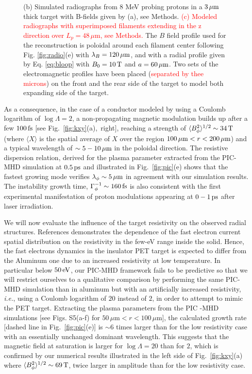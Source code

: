 \documentclass[aps,twocolumn,showpacs,superscriptaddress]{revtex4}
\begin{document}
\begin{figure}
{(b) Simulated radiographs from 8 MeV probing protons in a 
$3\,\rm \mu m$ thick target with B-fields given by (a), see Methods.
\textcolor{red}{(c) Modeled radiographs with superimposed filaments extending in the z direction over $L_p = 48\, \mu$m, see Methods.} The $B$ field profile used for the reconstruction is poloidal around each filament center following Fig. \ref{fig:radio}(e) with $\lambda_B = 120\,\rm \mu m$, and with a radial profile given by Eq. \eqref{eq:bloop} with $B_0=10\,\rm T$ and $a = 60\,\rm \mu m$.
Two sets of the electromagnetic profiles have been placed (\textcolor{red}{separated by thee microns}) on the front and the rear side of the target to model both expanding side of the target.
}
\end{figure}
%
As a consequence, in the case of a conductor modeled by using a Coulomb logarithm of $\log \Lambda = 2$,  a non-propagating magnetic modulation builds up after a few $100\,\rm fs$ [see \mbox{Fig.~\ref{fig:kxy}(a), right}], reaching a strength of  $\langle B_\phi^2\rangle^{1/2}\sim 34\,\rm T$ (where $\langle X \rangle$ is the spatial average of $X$ over the region  $100\,\mu\mathrm{m}<r<200\,\mu \rm m$) and a typical wavelength of $\sim 5-10\,\rm \mu m$  in the poloidal direction. The resistive dispersion relation, derived for the plasma parameter extracted from the PIC-MHD simulation at $0.5\,\rm ps$ and illustrated in Fig.~\ref{fig:pic}(e)  shows that the fastest growing mode verifies $\lambda_\phi \sim 5\,\mu \rm m$  in agreement with our simulation results. The instability  growth time, $\Gamma_\phi^{-1} \sim 160\,\rm fs$  is also  consistent with the first experimental manifestation of proton modulations appearing at $0-1\,\rm ps$ after laser irradiation.

We will now evaluate the influence of the target resistivity on the observed radial structures.
References \cite{PRL_McKenna_2011, PRL_MacLellan_2013} demonstrates the dependence of the fast electron current spatial distribution  on the resistivity in the few-eV range inside the solid. Hence, the fast electrons dynamics in the insulator PET target is expected to differ from the Aluminum one due to an increased resistivity at low temperature. In particular below $50\,\rm eV$, our PIC-MHD framework fails to be predictive so that we will restrict ourselves to a qualitative comparison by performing the same PIC-MHD simulation than in aluminum but with an artificially  increased resistivity, \emph{i.e.}, using  a Coulomb logarithm of $20$ instead of $2$, in order to attempt to mimic the PET target.
Extracting the plasma parameters from the PIC -MHD simulations [see Figs. S5(a-f) for $50\, \mu$m$<r<100\, \mu$m], 
the calculated growth rate [dashed line in Fig.~\ref{fig:pic}(e)] is $\sim 6$ times larger than for the  low resistivity case with  an  essentially unchanged dominant wavelength. This suggests \cite{POF_Davidson_1972} that the magnetic field at saturation is larger for $\log\Lambda = 20$ than for $2$, which is confirmed by our numerical results illustrated in  the left side of Fig.~\ref{fig:kxy}(a) where  $\langle B_\phi^2 \rangle^{1/2} \sim 69\,\rm T$, twice larger  in amplitude than for the low resistivity case. 
\end{document}

